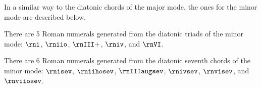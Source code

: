 
In a similar way to the diatonic chords of the major mode,
the ones for the minor mode are described below.


There are 5 Roman numerals generated from the diatonic
triads of the minor mode: $\rni$, $\rniio$, $\rnIII+$,
$\rniv$, and $\rnVI$.



There are 6 Roman numerals generated from the diatonic
seventh chords of the minor mode: $\rnisev$, $\rniihosev$,
$\rnIIIaugsev$, $\rnivsev$, $\rnvisev$, and $\rnviiosev$.
